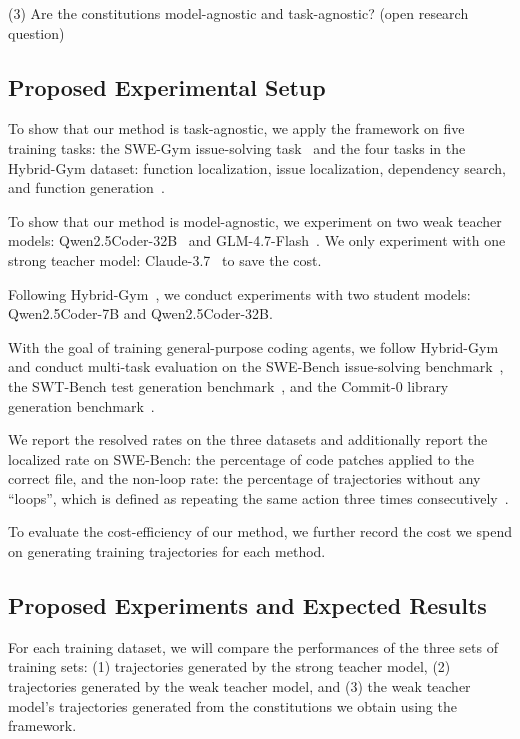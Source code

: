 (3) Are the constitutions model-agnostic and task-agnostic? (open research question)



\subsection{Proposed Experimental Setup}
To show that our method is task-agnostic, we apply the \plusname framework on five training tasks: the SWE-Gym issue-solving task~\cite{swegym} and the four tasks in the Hybrid-Gym dataset: function localization, issue localization, dependency search, and function generation~\cite{hybrid-gym}.

To show that our method is model-agnostic, we experiment on two weak teacher models: Qwen2.5Coder-32B~\cite{qwen25coder} and GLM-4.7-Flash~\cite{GLM-4.7}. We only experiment with one strong teacher model: Claude-3.7~\cite{claude37} to save the cost.

Following Hybrid-Gym~\cite{hybrid-gym}, we conduct experiments with two student models: Qwen2.5Coder-7B and Qwen2.5Coder-32B.

With the goal of training general-purpose coding agents, we follow Hybrid-Gym~\cite{hybrid-gym} and conduct multi-task evaluation on the SWE-Bench issue-solving benchmark~\cite{swebench}, the SWT-Bench test generation benchmark~\cite{swt-bench}, and the Commit-0 library generation benchmark~\cite{commit0}.

We report the resolved rates on the three datasets and additionally report the localized rate on SWE-Bench: the percentage of code patches applied to the correct file, and the non-loop rate: the percentage of trajectories without any ``loops'', which is defined as repeating the same action three times consecutively~\cite{swegym}.

To evaluate the cost-efficiency of our method, we further record the cost we spend on generating training trajectories for each method.


\subsection{Proposed Experiments and Expected Results}
For each training dataset, we will compare the performances of the three sets of training sets: (1) trajectories generated by the strong teacher model, 
(2) trajectories generated by the weak teacher model, and 
(3) the weak teacher model's trajectories generated from the constitutions we obtain using the \plusname framework.

